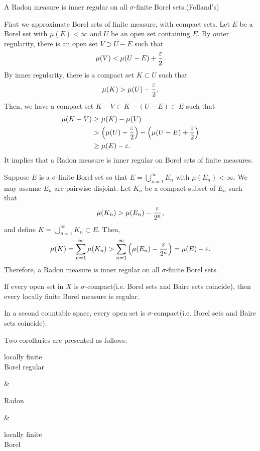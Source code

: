 \documentclass{../../large}
\begin{document}
\begin{prop}
A Radon measure is inner regular on all $\sigma$-finite Borel sets.(Folland's)
\end{prop}
\begin{pf}
First we approximate Borel sets of finite measure, with compact sets.
Let $E$ be a Borel set with $\mu(E)<\infty$ and $U$ be an open set containing $E$.
By outer regularity, there is an open set $V\supset U-E$ such that
\[\mu(V)<\mu(U-E)+\frac{\varepsilon}2.\]
By inner regularity, there is a compact set $K\subset U$ such that
\[\mu(K)>\mu(U)-\frac{\varepsilon}2.\]
Then, we have a compact set $K-V\subset K-(U-E)\subset E$ such that
\begin{align*}
\mu(K-V)&\ge\mu(K)-\mu(V)\\
&>\left(\mu(U)-\frac{\varepsilon}2\right)-\left(\mu(U-E)+\frac{\varepsilon}2\right)\\
&\ge\mu(E)-\varepsilon.
\end{align*}
It implies that a Radon measure is inner regular on Borel sets of finite measures.

Suppose $E$ is a $\sigma$-finite Borel set so that $E=\bigcup_{n=1}^\infty E_n$ with $\mu(E_n)<\infty$.
We may assume $E_n$ are pairwise disjoint.
Let $K_n$ be a compact subset of $E_n$ such that
\[\mu(K_n)>\mu(E_n)-\frac{\varepsilon}{2^n},\]
and define $K=\bigcup_{n=1}^\infty K_n\subset E$.
Then,
\[\mu(K)=\sum_{n=1}^\infty\mu(K_n)>\sum_{n=1}^\infty\left(\mu(E_n)-\frac{\varepsilon}{2^n}\right)=\mu(E)-\varepsilon.\]
Therefore, a Radon measure is inner regular on all $\sigma$-finite Borel sets.
\end{pf}

\begin{thm}
If every open set in $X$ is $\sigma$-compact(i.e. Borel sets and Baire sets coincide), then every locally finite Borel measure is regular.
\end{thm}
\begin{prop}
In a second countable space, every open set is $\sigma$-compact(i.e. Borel sets and Baire sets coincide).
\end{prop}


Two corollaries are presented as follows:
\begin{rd}[column sep={120pt,between origins}]
\parbox{7em}{\centering locally finite \\ Borel regular} \rar &
\parbox{5em}{\centering Radon} \rar {} &
\parbox{7em}{\centering locally finite \\ Borel} 
\end{rd}
\end{document}
